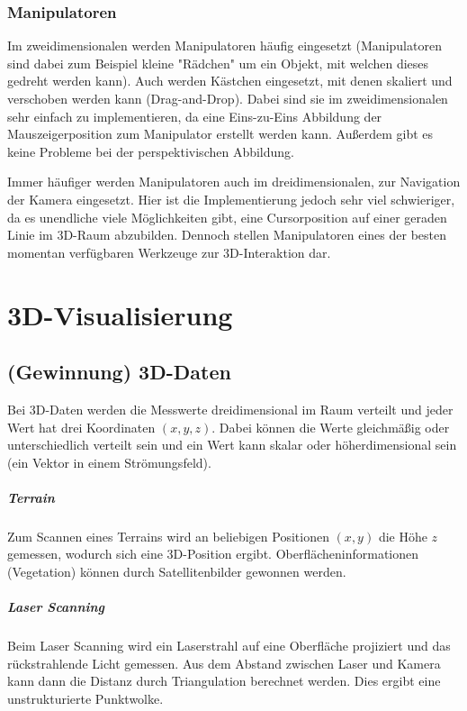 		\subsection{Manipulatoren}
			Im zweidimensionalen werden Manipulatoren häufig eingesetzt (Manipulatoren sind dabei zum Beispiel kleine "Rädchen" um ein Objekt, mit welchen dieses gedreht werden kann). Auch werden \zB Kästchen eingesetzt, mit denen skaliert und verschoben werden kann (Drag-and-Drop). Dabei sind sie im zweidimensionalen sehr einfach zu implementieren, da eine Eins-zu-Eins Abbildung der Mauszeigerposition zum Manipulator erstellt werden kann. Außerdem gibt es keine Probleme bei der perspektivischen Abbildung.
			
			Immer häufiger werden Manipulatoren auch im dreidimensionalen, \zB zur Navigation der Kamera eingesetzt. Hier ist die Implementierung jedoch sehr viel schwieriger, da es unendliche viele Möglichkeiten gibt, eine Cursorposition auf einer geraden Linie im 3D-Raum abzubilden. Dennoch stellen Manipulatoren eines der besten momentan verfügbaren Werkzeuge zur 3D-Interaktion dar.

\chapter{3D-Visualisierung}
	\section{(Gewinnung) 3D-Daten}
		Bei 3D-Daten werden die Messwerte dreidimensional im Raum verteilt und jeder Wert hat drei Koordinaten \( (x, y, z) \). Dabei können die Werte gleichmäßig oder unterschiedlich verteilt sein und ein Wert kann skalar oder höherdimensional sein (\zB ein Vektor in einem Strömungsfeld).

		\paragraph{Terrain}
			Zum Scannen eines Terrains wird an beliebigen Positionen \( (x, y) \) die Höhe \(z\) gemessen, wodurch sich eine 3D-Position ergibt. Oberflächeninformationen (\zB Vegetation) können durch Satellitenbilder gewonnen werden.

		\paragraph{Laser Scanning}
			Beim Laser Scanning wird ein Laserstrahl auf eine Oberfläche projiziert und das rückstrahlende Licht gemessen. Aus dem Abstand zwischen Laser und Kamera kann dann die Distanz durch Triangulation berechnet werden. Dies ergibt eine unstrukturierte Punktwolke.

